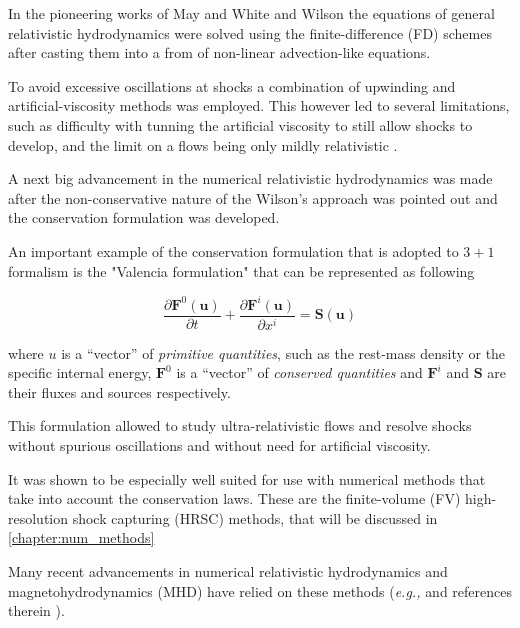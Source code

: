 In the pioneering works of May and White \cite{May:1966} and Wilson \cite{Wilson:1972} the equations of general relativistic hydrodynamics were solved using the finite-difference (FD) schemes after casting them into a from of non-linear advection-like equations. 

To avoid excessive oscillations at shocks a combination of upwinding and artificial-viscosity methods was employed. 
This however led to several limitations, such as difficulty with tunning the artificial viscosity to still allow shocks to develop, and the limit on a flows being only mildly relativistic \cite{Font:2008fka}. 

A next big advancement in the numerical relativistic hydrodynamics was made after the non-conservative nature of the Wilson’s approach was pointed out \cite{Marti:1991wi} and the conservation formulation was developed. 

An important example of the conservation formulation that is adopted to $3 + 1$ formalism is the "Valencia formulation" \cite{Banyuls:1997} that can be represented as following

\begin{equation}
\frac{\partial\boldsymbol{F}^{0}(\boldsymbol{u})}{\partial t} + \frac{\partial\boldsymbol{F}^{i}(\boldsymbol{u})}{\partial x^{i}} = \boldsymbol{S}(\boldsymbol{u})
\label{eq:theory:valencia_formalism}
\end{equation}

where $u$ is a “vector” of \textit{primitive quantities}, such as the rest-mass density or the specific internal energy, $\boldsymbol{F}^0$ is a “vector” of \textit{conserved quantities} and $\boldsymbol{F}^i$ and $\boldsymbol{S}$ are their fluxes and sources respectively.

This formulation allowed to study ultra-relativistic flows and resolve shocks without spurious oscillations and without need for artificial viscosity.

It was shown to be especially well suited for use with numerical methods that take into account the conservation laws. 
These are the finite-volume (FV) high-resolution shock capturing (HRSC) methods, that will be discussed in  \ref{chapter:num_methods}

Many recent advancements in numerical relativistic hydrodynamics and magnetohydrodynamics (MHD) have relied on these methods (\textit{e.g.,} \cite{Giacomazzo:2010bx} \cite{Rezzolla:2011da} and references therein ).

